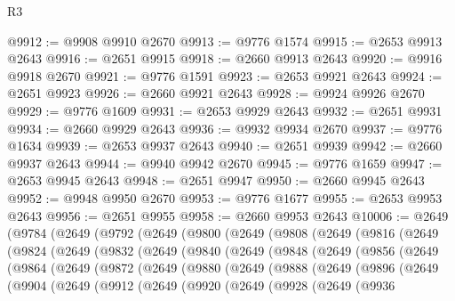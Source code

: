 \begin{lexlean}{R3}
\begin{coremodule}
@9912 := @9908 @9910 @2670
@9913 := @9776 @1574
@9915 := @2653 @9913 @2643
@9916 := @2651 @9915
@9918 := @2660 @9913 @2643
@9920 := @9916 @9918 @2670
@9921 := @9776 @1591
@9923 := @2653 @9921 @2643
@9924 := @2651 @9923
@9926 := @2660 @9921 @2643
@9928 := @9924 @9926 @2670
@9929 := @9776 @1609
@9931 := @2653 @9929 @2643
@9932 := @2651 @9931
@9934 := @2660 @9929 @2643
@9936 := @9932 @9934 @2670
@9937 := @9776 @1634
@9939 := @2653 @9937 @2643
@9940 := @2651 @9939
@9942 := @2660 @9937 @2643
@9944 := @9940 @9942 @2670
@9945 := @9776 @1659
@9947 := @2653 @9945 @2643
@9948 := @2651 @9947
@9950 := @2660 @9945 @2643
@9952 := @9948 @9950 @2670
@9953 := @9776 @1677
@9955 := @2653 @9953 @2643
@9956 := @2651 @9955
@9958 := @2660 @9953 @2643
@10006 := @2649
    (@9784
      (@2649
        (@9792
          (@2649
            (@9800
              (@2649
                (@9808
                  (@2649
                    (@9816
                      (@2649
                        (@9824
                          (@2649
                            (@9832
                              (@2649
                                (@9840
                                  (@2649
                                    (@9848
                                      (@2649
                                        (@9856
                                          (@2649
                                            (@9864
                                              (@2649
                                                (@9872
                                                  (@2649
                                                    (@9880
                                                      (@2649
                                                        (@9888
                                                          (@2649
                                                            (@9896
                                                              (@2649
                                                                (@9904
                                                                  (@2649
                                                                    (@9912
                                                                      (@2649
                                                                        (@9920
                                                                          (@2649
                                                                            (@9928
                                                                              (@2649
                                                                                (@9936

\end{coremodule}
\end{lexlean}

